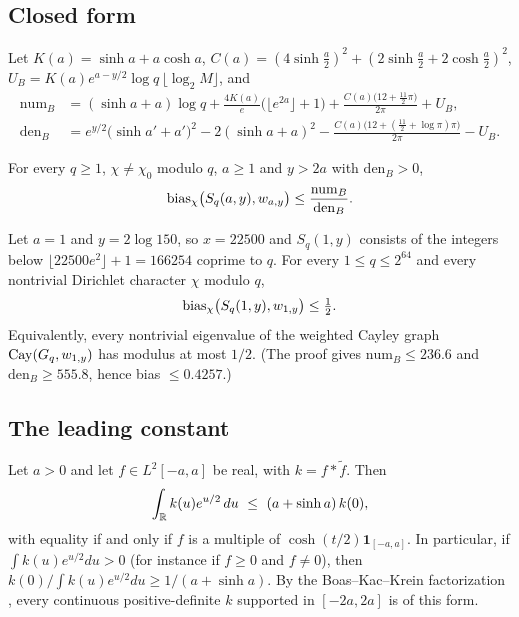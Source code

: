 \subsection{Closed form}
Let $K(a)=\sinh a+a\cosh a$, $C(a)=(4\sinh\frac a2)^2+(2\sinh\frac a2+2\cosh\frac a2)^2$,
$U_B=K(a)e^{a-y/2}\log q\,\lfloor\log_2M\rfloor$, and
\begin{align*}
  \mathrm{num}_B&=(\sinh a+a)\log q+\frac{4K(a)}{e}\bigl(\lfloor e^{2a}\rfloor+1\bigr)
     +\frac{C(a)\bigl(12+\frac{11}2\pi\bigr)}{2\pi}+U_B,\\
  \mathrm{den}_B&=e^{y/2}\bigl(\sinh a'+a'\bigr)^2-2(\sinh a+a)^2-\frac{C(a)\bigl(12+(\frac{11}2+\log\pi)\pi\bigr)}{2\pi}-U_B .
\end{align*}

\begin{theorem}\label{thm:closed}
For every $q\ge1$, $\chi\ne\chi_0$ modulo $q$, $a\ge1$ and $y>2a$ with $\mathrm{den}_B>0$,
\[
  \operatorname{bias}_\chi\bigl(S_q(a,y),w_{a,y}\bigr)\le\frac{\mathrm{num}_B}{\mathrm{den}_B}.
\]
\end{theorem}

\begin{corollary}\label{cor:cert}
Let $a=1$ and $y=2\log150$, so $x=22500$ and $S_q(1,y)$ consists of the integers below
$\lfloor22500e^2\rfloor+1=166254$ coprime to $q$. For every $1\le q\le2^{64}$ and every nontrivial
Dirichlet character $\chi$ modulo $q$,
\[
  \operatorname{bias}_\chi\bigl(S_q(1,y),w_{1,y}\bigr)\le\tfrac12 .
\]
Equivalently, every nontrivial eigenvalue of the weighted Cayley graph $\mathrm{Cay}(G_q,w_{1,y})$ has modulus
at most $1/2$. (The proof gives $\mathrm{num}_B\le236.6$ and $\mathrm{den}_B\ge555.8$, hence bias $\le0.4257$.)
\end{corollary}

\subsection{The leading constant}

\begin{proposition}\label{prop:opt}
Let $a>0$ and let $f\in L^2[-a,a]$ be real, with $k=f*\tilde f$. Then
\[
  \int_{\mathbb{R}} k(u)e^{u/2}\,du\ \le\ (a+\sinh a)\,k(0),
\]
with equality if and only if $f$ is a multiple of $\cosh(t/2)\mathbf 1_{[-a,a]}$. In particular, if
$\int k(u)e^{u/2}du>0$ (for instance if $f\ge0$ and $f\ne0$), then $k(0)/\int k(u)e^{u/2}du\ge1/(a+\sinh a)$. By the
Boas--Kac--Krein factorization \cite{boaskac1945,ehmgneitingrichards2004}, every continuous positive-definite
$k$ supported in $[-2a,2a]$ is of this form.
\end{proposition}

